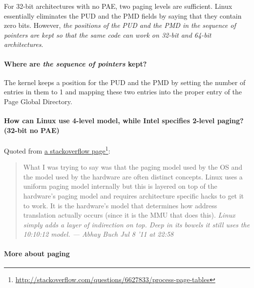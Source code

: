 For 32-bit architectures with no PAE, two paging levels are sufficient. Linux essentially
eliminates the PUD and the PMD fields by saying that they contain zero bits. However,
\emph{the positions of the PUD and the PMD in the sequence of pointers are kept so that
  the same code can work on 32-bit and 64-bit architectures}. 

\paragraph{Where are \emph{the sequence of pointers} kept?}

The kernel keeps a position for the PUD and the PMD by setting the number of entries in
them to 1 and mapping these two entries into the proper entry of the Page Global
Directory.

\paragraph{How can Linux use 4-level model, while Intel specifies 2-level paging? (32-bit
  no PAE)}

Quoted from \href{http://stackoverflow.com/questions/6627833/process-page-tables}{a stackoverflow page}\footnote{\url{http://stackoverflow.com/questions/6627833/process-page-tables}}:
\begin{quote}
  What I was trying to say was that the paging model used by the OS and the model used by
  the hardware are often distinct concepts. Linux uses a uniform paging model internally
  but this is layered on top of the hardware's paging model and requires architecture
  specific hacks to get it to work. It is the hardware's model that determines how address
  translation actually occurs (since it is the MMU that does this). \emph{Linux simply
    adds a layer of indirection on top. Deep in its bowels it still uses the 10:10:12
    model. --- Abhay Buch Jul 8 '11 at 22:58}
\end{quote}

\paragraph{More about paging}

